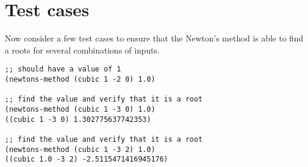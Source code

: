 \documentclass{article}
\begin{document}
\section{Test cases}

Now consider a few test cases to ensure that the Newton's method is able to find
a roots for several combinations of inputs.

\begin{lstlisting}[style=scheme]
;; should have a value of 1
(newtons-method (cubic 1 -2 0) 1.0)

;; find the value and verify that it is a root
(newtons-method (cubic 1 -3 0) 1.0)
((cubic 1 -3 0) 1.302775637742353)

;; find the value and verify that it is a root
(newtons-method (cubic 1 -3 2) 1.0)
((cubic 1.0 -3 2) -2.5115471416945176)
\end{lstlisting}
\end{document}
